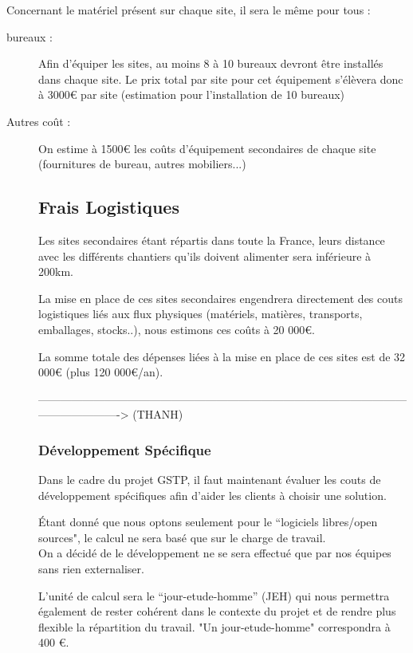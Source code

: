 Concernant le matériel présent sur chaque site, il sera le même pour tous : 
\begin{description}
	\item[bureaux : ] Afin d'équiper les sites, au moins 8 à 10 bureaux devront être installés dans chaque site. Le prix total par site pour cet équipement s'élèvera donc à 3000€ par site (estimation pour l'installation de 10 bureaux)
	\item[Autres coût :]  On estime à 1500€ les coûts d'équipement secondaires de chaque site (fournitures de bureau, autres mobiliers...)

\subsection{Frais Logistiques}
Les sites secondaires étant répartis dans toute la France, leurs distance avec les différents chantiers qu'ils doivent alimenter sera inférieure à 200km.

La mise en place de ces sites secondaires engendrera directement des couts logistiques liés aux flux physiques (matériels, matières, transports, emballages, stocks..), nous estimons ces coûts à 20 000€.

La somme totale des dépenses liées à la mise en place de ces sites est de 32 000€ (plus 120 000€/an).


-------------------------------------------------------------------------------------------------------------------------> (THANH)

\subsubsection{Développement Spécifique}

Dans le cadre du projet GSTP, il faut maintenant évaluer les couts de développement spécifiques afin d'aider les clients à choisir une solution.


Étant donné que nous optons seulement pour le ``logiciels libres/open sources", le calcul ne sera basé que sur le charge de travail.\\

On a décidé de le développement ne se sera effectué que par nos équipes sans rien externaliser.

L’unité de calcul sera le ``jour-etude-homme'' (JEH) qui nous permettra également de rester cohérent dans le contexte du projet et de rendre plus flexible la répartition du travail. "Un jour-etude-homme" correspondra à 400 €.


\end{description}
